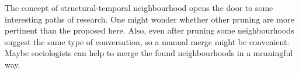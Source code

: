 \documentclass[conference]{IEEEtran}
\begin{document}
The concept of structural-temporal neighbourhood opens the door to some interesting paths of research. One might wonder whether other pruning are more pertinent than the proposed here. Also, even after pruning some neighbourhoods suggest the same type of conversation, so a manual merge might be convenient. Maybe sociologists can help to merge the found neighbourhoods in a meaningful way.   






\newpage
\end{document}
